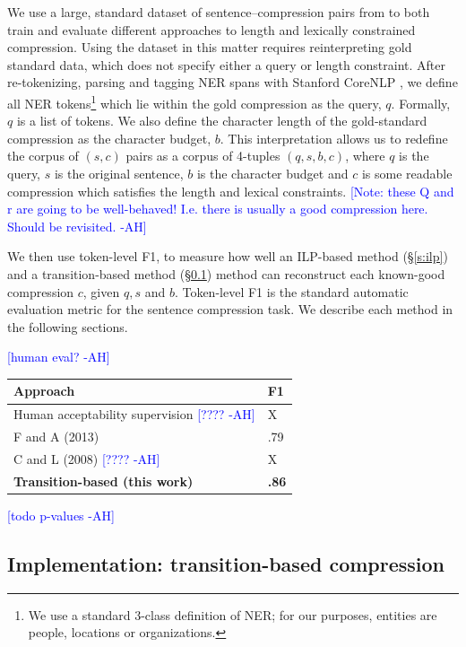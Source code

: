 \documentclass[11pt,a4paper]{article}
\newcommand{\ahcomment}[1]{\textcolor{blue}{[#1 -AH]}}
\begin{document}
We use a large, standard dataset of sentence--compression pairs from \citet{filippova2013overcoming} to both train and evaluate different approaches to length and lexically constrained compression. Using the dataset in this matter requires reinterpreting gold standard data, which does not specify either a query or length constraint. After re-tokenizing, parsing and tagging NER spans with Stanford CoreNLP \cite{corenlp}, we define all NER tokens\footnote{We use a standard 3-class definition of NER; for our purposes, entities are people, locations or organizations.} which lie within the gold compression as the query, $q$. Formally, $q$ is a list of tokens. We also define the character length of the gold-standard compression as the character budget, $b$. This interpretation allows us to redefine the corpus of $(s,c)$ pairs as a corpus of 4-tuples $(q,s,b,c)$, where $q$ is the query, $s$ is the original sentence, $b$ is the character budget and $c$ is some readable compression which satisfies the length and lexical constraints.  \ahcomment{Note: these Q and r are going to be well-behaved! I.e. there is usually a good compression here. Should be revisited.}

We then use token-level F1, to measure how well an ILP-based method (\S\ref{s:ilp}) and a transition-based method (\S\ref{s:transition}) method can reconstruct each known-good compression $c$, given $q,s$ and $b$. Token-level F1 is the standard automatic evaluation metric for the sentence compression task. We describe each method in the following sections.

\ahcomment{human eval?}
    
\begin{table}[htb!]
\begin{tabular}{ll}
\centering
Approach & F1  \\ \hline
Human acceptability supervision \ahcomment{????}        &  X        \\
F and A (2013)    & .79           \\
C and L (2008)  \ahcomment{????}  & X      \\
\textbf{Transition-based (this work)} &  \textbf{.86}    \\   
\end{tabular}
\end{table}

\ahcomment{todo p-values}


\subsection{Implementation: transition-based compression}\label{s:transition}
\end{document}
